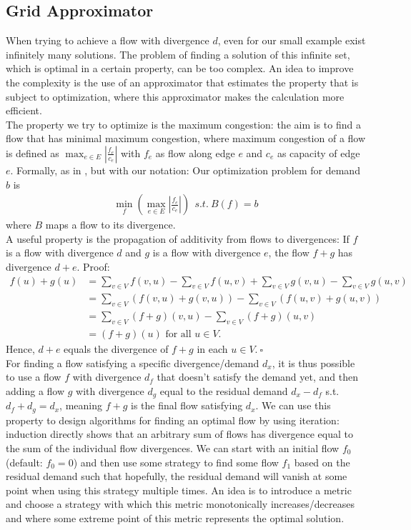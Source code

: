 \subsection{Grid Approximator}
\label{sec_gridapprox}
When trying to achieve a flow with divergence $d$, even for our small example exist infinitely many solutions. The problem of finding a solution of this infinite set, which is optimal in a certain property, can be too complex. An idea to improve the complexity is the use of an approximator that estimates the property that is subject to optimization, where this approximator makes the calculation more efficient.\\
The property we try to optimize is the maximum congestion: the aim is to find a flow that has minimal maximum congestion, where maximum congestion of a flow is defined as $\max_{e\in E}\left\vert\frac{f_e}{c_e}\right\vert$ with $f_e$ as flow along edge $e$ and $c_e$ as capacity of edge $e$. Formally, as in \cite{nmfnlt}, but with our notation: Our optimization problem for demand $b$ is
\begin{align}
\min_{f}\left(\max_{e\in E}\left\vert\frac{f_e}{c_e}\right\vert\right) ~~  s.t.~B(f)=b\tag{Optimization Problem}
\label{mincong}
\end{align}
where $B$ maps a flow to its divergence.\\
A useful property is the propagation of additivity from flows to divergences: If $f$ is a flow with divergence $d$ and $g$ is a flow with divergence $e$, the flow $f+g$ has divergence $d+e$. Proof:
\begin{align*}
f(u)+g(u)&
=\sum_{v\in V}f(v,u)-\sum_{v\in V}f(u,v)+\sum_{v\in V}g(v,u)-\sum_{v\in V}g(u,v)\\
&=\sum_{v\in V}(f(v,u)+g(v,u))-\sum_{v\in V}(f(u,v)+g(u,v))\\
&=\sum_{v\in V}(f+g)(v,u)-\sum_{v\in V}(f+g)(u,v)\\
&=(f+g)(u) \text{ for all } u\in V.
\end{align*}
Hence, $d+e$ equals the divergence of $f+g$ in each $u\in V.~\square$\\
For finding a flow satisfying a specific divergence/demand $d_x$, it is thus possible to use a flow $f$ with divergence $d_f$ that doesn't satisfy the demand yet, and then adding a flow $g$ with divergence $d_g$ equal to the residual demand $d_x-d_f$ s.t. $d_f+d_g=d_x$, meaning $f+g$ is the final flow satisfying $d_x$.
We can use this property to design algorithms for finding an optimal flow by using iteration: induction directly shows that an arbitrary sum of flows has divergence equal to the sum of the individual flow divergences. We can start with an initial flow $f_0$ (default: $f_0=0$) and then use some strategy to find some flow $f_1$ based on the residual demand such that hopefully, the residual demand will vanish at some point when using this strategy multiple times. An idea is to introduce a metric and choose a strategy with which this metric monotonically increases/decreases and where some extreme point of this metric represents the optimal solution.\\
